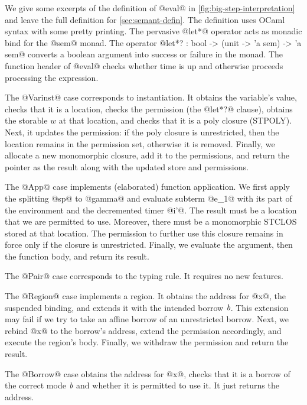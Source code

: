 

We give some excerpts of the definition of @eval@ in
\cref{fig:big-step-interpretation} and leave the full
definition for \cref{sec:semant-defin}.
The definition uses OCaml syntax with some pretty
printing. The pervasive @let*@ operator acts as monadic bind
for the @sem@ monad. The operator
@let*? : bool -> (unit -> 'a sem) -> 'a sem@
 converts a boolean
argument into success or failure in the monad.
 The function header of @eval@ checks
whether time is up and otherwise proceeds processing the expression.

The @Varinst@ case corresponds to instantiation. It
obtains the variable's value, checks that it is a location, checks the
permission (the @let*?@ clause), obtains the storable $w$ at that
location, and checks that it is a poly closure (STPOLY). Next, it updates the
permission: if the poly closure is unrestricted, then the location
remains in the permission set, otherwise it is removed. Finally, we
allocate a new monomorphic closure, add it to the permissions, and
return the pointer as the result along with the updated store and
permissions.

The @App@ case implements (elaborated) function application.
We first apply the splitting @sp@ to @gamma@ and
evaluate subterm @e_1@ with its part of the environment and the
decremented timer @i'@. The result must be a location that we are
permitted to use. Moreover, there must be a monomorphic STCLOS stored
at that location. The permission to further use this closure  remains
in force only if the closure is unrestricted. Finally, we evaluate the
argument, then the function body, and return its result.

The @Pair@ case corresponds to the  typing rule. It
requires no new features.


The @Region@ case implements a region. It obtains the address for @x@,
the suspended binding, and extends it with the intended borrow
$\textit{b}$. This extension may fail if we try to take an affine borrow
of an unrestricted borrow. Next, we rebind @x@ to the borrow's
address, extend the permission accordingly, and execute the region's
body.  Finally, we withdraw the permission and return the result.

The @Borrow@ case obtains the address for @x@, checks that it is a
borrow of the correct mode $\textit{b}$ and whether it is permitted to
use it. It just returns the address.

\lstDeleteShortInline@

